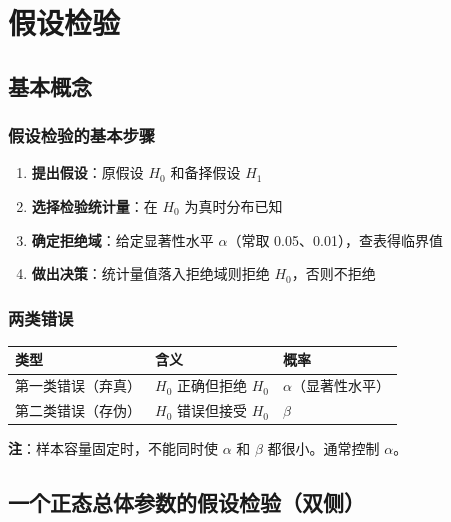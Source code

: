 \documentclass[12pt, a4paper]{article}
\begin{document}
\section{假设检验}

\subsection{基本概念}

\subsubsection{假设检验的基本步骤}

\begin{enumerate}
    \item \textbf{提出假设}：原假设 $H_0$ 和备择假设 $H_1$
    \item \textbf{选择检验统计量}：在 $H_0$ 为真时分布已知
    \item \textbf{确定拒绝域}：给定显著性水平 $\alpha$（常取 0.05、0.01），查表得临界值
    \item \textbf{做出决策}：统计量值落入拒绝域则拒绝 $H_0$，否则不拒绝
\end{enumerate}

\subsubsection{两类错误}

\begin{center}
    \begin{tabular}{lll}
        \toprule
        类型        & 含义                & 概率              \\
        \midrule
        第一类错误（弃真） & $H_0$ 正确但拒绝 $H_0$ & $\alpha$（显著性水平） \\
        第二类错误（存伪） & $H_0$ 错误但接受 $H_0$ & $\beta$         \\
        \bottomrule
    \end{tabular}
\end{center}

\textbf{注}：样本容量固定时，不能同时使 $\alpha$ 和 $\beta$ 都很小。通常控制 $\alpha$。

\subsection{一个正态总体参数的假设检验（双侧）}
\end{document}
